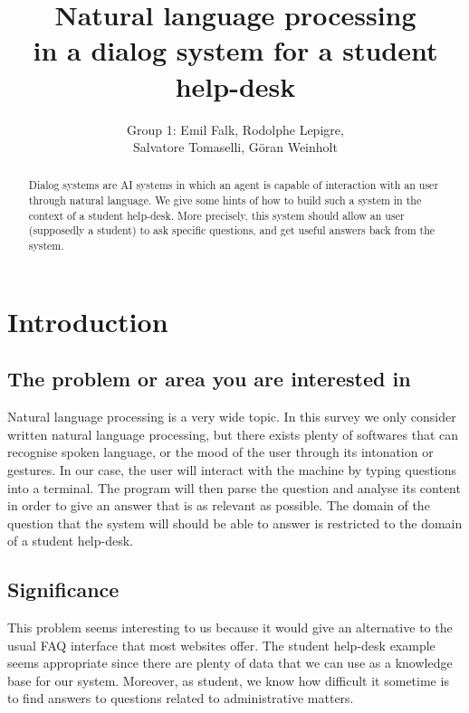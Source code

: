 \documentclass[a4paper,11pt]{article}
\begin{document}
\title{Natural language processing\\
in a dialog system for a student help-desk}
\author{Group 1: Emil Falk, Rodolphe Lepigre,\\
        Salvatore Tomaselli, G\"oran Weinholt}
\maketitle
\begin{abstract}\centering
Dialog systems are AI systems in which an agent is capable of interaction with
an user through natural language. We give some hints of how to build such a
system in the context of a student help-desk. More precisely, this system
should allow an user (supposedly a student) to ask specific questions, and get
useful answers back from the system.
\end{abstract}

\section{Introduction}
\subsection{The problem or area you are interested in}
Natural language processing is a very wide topic. In this survey we only
consider written natural language processing, but there exists plenty of
softwares that can recognise spoken language, or the mood of the user through
its intonation or gestures. In our case, the user will interact with the machine
by typing questions into a terminal. The program will then parse the question
and analyse its content in order to give an answer that is as relevant as
possible. The domain of the question that the system will should be able to
answer is restricted to the domain of a student help-desk.

\subsection{Significance}
This problem seems interesting to us because it would give an alternative to
the usual FAQ interface that most websites offer. The student help-desk example
seems appropriate since there are plenty of data that we can use as a knowledge
base for our system. Moreover, as student, we know how difficult it sometime is
to find answers to questions related to administrative matters.
\end{document}
